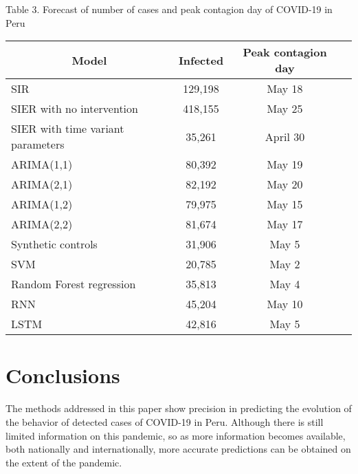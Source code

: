 \documentclass[12pt]{article}
\begin{document}
\begin{flushleft}
\centering Table 3. Forecast of number of cases and peak contagion day of COVID-19 in Peru \end{flushleft}
\begin{table}[h]
\centering
\begin{tabular}{ | p{7cm} | p{2cm} | p{2cm} | p{2cm} | }
\hline
\multicolumn{1}{|c|}{Model} & \multicolumn{1}{|c|}{Infected} & \multicolumn{1}{|c|}{Peak contagion day} \\ [0.5ex] 
\hline\hline
SIR & \multicolumn{1}{|c|}{129,198}  & \multicolumn{1}{|c|}{May 18} \\
SIER with no intervention & \multicolumn{1}{|c|}{418,155} & \multicolumn{1}{|c|}{May 25}  \\
SIER with time variant parameters & \multicolumn{1}{|c|}{35,261} & \multicolumn{1}{|c|}{April 30} \\
ARIMA(1,1) & \multicolumn{1}{|c|}{80,392} & \multicolumn{1}{|c|}{May 19} \\
ARIMA(2,1) & \multicolumn{1}{|c|}{82,192} & \multicolumn{1}{|c|}{May 20} \\
ARIMA(1,2) & \multicolumn{1}{|c|}{79,975} & \multicolumn{1}{|c|}{May 15} \\
ARIMA(2,2) & \multicolumn{1}{|c|}{81,674} & \multicolumn{1}{|c|}{May 17} \\
Synthetic controls & \multicolumn{1}{|c|}{31,906} & \multicolumn{1}{|c|}{May 5} \\
SVM & \multicolumn{1}{|c|}{20,785} & \multicolumn{1}{|c|}{May 2} \\
Random Forest regression & \multicolumn{1}{|c|}{35,813} & \multicolumn{1}{|c|}{May 4} \\
RNN & \multicolumn{1}{|c|}{45,204} & \multicolumn{1}{|c|}{May 10} \\
LSTM & \multicolumn{1}{|c|}{42,816} & \multicolumn{1}{|c|}{May 5}  \\
\hline
\end{tabular}
\end{table}


\clearpage

\section{Conclusions} \label{sec:conclusion}

The methods addressed in this paper show precision in predicting the evolution of the behavior of detected cases of COVID-19 in Peru. Although there is still limited information on this pandemic, so as more information becomes available, both nationally and internationally, more accurate predictions can be obtained on the extent of the pandemic.
\end{document}

